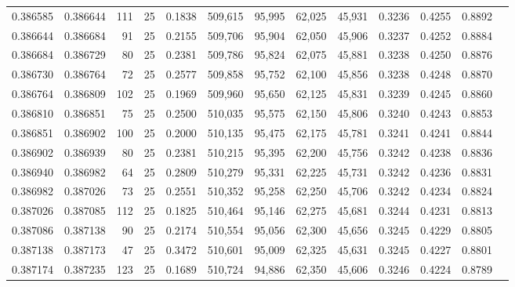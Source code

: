 \begin{tabular}{rrrrrrrrrrrrr}
0.386585 & 0.386644 &   111 &  25 &                                     0.1838 & 509,615 &  95,995 &  62,025 &  45,931 & 0.3236 & 0.4255 & 0.8892 \\
0.386644 & 0.386684 &    91 &  25 &                                     0.2155 & 509,706 &  95,904 &  62,050 &  45,906 & 0.3237 & 0.4252 & 0.8884 \\
0.386684 & 0.386729 &    80 &  25 &                                     0.2381 & 509,786 &  95,824 &  62,075 &  45,881 & 0.3238 & 0.4250 & 0.8876 \\
0.386730 & 0.386764 &    72 &  25 &                                     0.2577 & 509,858 &  95,752 &  62,100 &  45,856 & 0.3238 & 0.4248 & 0.8870 \\
0.386764 & 0.386809 &   102 &  25 &                                     0.1969 & 509,960 &  95,650 &  62,125 &  45,831 & 0.3239 & 0.4245 & 0.8860 \\
0.386810 & 0.386851 &    75 &  25 &                                     0.2500 & 510,035 &  95,575 &  62,150 &  45,806 & 0.3240 & 0.4243 & 0.8853 \\
0.386851 & 0.386902 &   100 &  25 &                                     0.2000 & 510,135 &  95,475 &  62,175 &  45,781 & 0.3241 & 0.4241 & 0.8844 \\
0.386902 & 0.386939 &    80 &  25 &                                     0.2381 & 510,215 &  95,395 &  62,200 &  45,756 & 0.3242 & 0.4238 & 0.8836 \\
0.386940 & 0.386982 &    64 &  25 &                                     0.2809 & 510,279 &  95,331 &  62,225 &  45,731 & 0.3242 & 0.4236 & 0.8831 \\
0.386982 & 0.387026 &    73 &  25 &                                     0.2551 & 510,352 &  95,258 &  62,250 &  45,706 & 0.3242 & 0.4234 & 0.8824 \\
0.387026 & 0.387085 &   112 &  25 &                                     0.1825 & 510,464 &  95,146 &  62,275 &  45,681 & 0.3244 & 0.4231 & 0.8813 \\
0.387086 & 0.387138 &    90 &  25 &                                     0.2174 & 510,554 &  95,056 &  62,300 &  45,656 & 0.3245 & 0.4229 & 0.8805 \\
0.387138 & 0.387173 &    47 &  25 &                                     0.3472 & 510,601 &  95,009 &  62,325 &  45,631 & 0.3245 & 0.4227 & 0.8801 \\
0.387174 & 0.387235 &   123 &  25 &                                     0.1689 & 510,724 &  94,886 &  62,350 &  45,606 & 0.3246 & 0.4224 & 0.8789 \\

\end{tabular}
